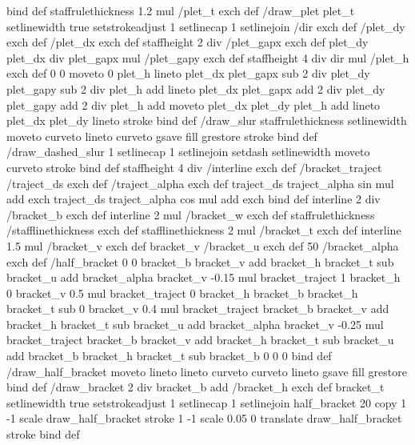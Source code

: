 {{{ } bind def
staffrulethickness 1.2 mul /plet_t exch def
/draw_plet
{
	plet_t setlinewidth
	true setstrokeadjust
	1 setlinecap
	1 setlinejoin
	/dir exch def
	/plet_dy exch def
	/plet_dx exch def
	staffheight 2 div /plet_gapx exch def
	plet_dy plet_dx div plet_gapx mul /plet_gapy exch def
	staffheight 4 div dir mul /plet_h exch def
%
	0 0 moveto
	0 plet_h lineto 
	plet_dx plet_gapx sub 2 div 
		plet_dy plet_gapy sub 2 div plet_h add lineto
	plet_dx plet_gapx add 2 div 
		plet_dy plet_gapy add 2 div plet_h add moveto
	plet_dx plet_dy plet_h add lineto
	plet_dx plet_dy lineto
	stroke
} bind def
%
/draw_slur
{
	staffrulethickness setlinewidth
	moveto
	curveto
	lineto
	curveto
	gsave
	fill
	grestore
	stroke
} bind def
%
/draw_dashed_slur
{
	1 setlinecap
	1 setlinejoin
	setdash
	setlinewidth
	moveto
	curveto
	stroke
} bind def
%
staffheight 4 div /interline exch def
%
/bracket_traject
{
  /traject_ds exch def
  /traject_alpha exch def
  traject_ds traject_alpha sin mul add
  exch
  traject_ds traject_alpha cos mul add
  exch
} bind def
%
interline 2 div /bracket_b exch def
interline 2 mul /bracket_w exch def
staffrulethickness /stafflinethickness exch def
stafflinethickness 2 mul /bracket_t exch def
interline 1.5 mul /bracket_v exch def
bracket_v /bracket_u exch def
50 /bracket_alpha exch def
%
/half_bracket
{
	0 0
	bracket_b bracket_v add bracket_h bracket_t sub bracket_u add
	bracket_alpha bracket_v -0.15 mul bracket_traject
	1 bracket_h
	0 bracket_v 0.5 mul bracket_traject
	0 bracket_h
	bracket_b bracket_h bracket_t sub
	0 bracket_v 0.4 mul bracket_traject
	bracket_b bracket_v add bracket_h bracket_t sub bracket_u add
	bracket_alpha bracket_v -0.25 mul bracket_traject
	bracket_b bracket_v add bracket_h bracket_t sub bracket_u add
	bracket_b bracket_h bracket_t sub
	bracket_b 0
	0 0
} bind def
%
/draw_half_bracket {
	moveto
	lineto
	lineto
	curveto
	curveto
	lineto
	gsave
	fill
	grestore
} bind def
%
/draw_bracket
{
	2 div bracket_b add /bracket_h exch def
	bracket_t setlinewidth
	true setstrokeadjust
	1 setlinecap
	1 setlinejoin
	half_bracket
	20 copy
	1 -1 scale
	draw_half_bracket
	stroke
	1 -1 scale
	0.05 0 translate
	draw_half_bracket
	stroke
} bind def
}}

\def\turnOnExperimentalFeatures{%
\special{ps:
}}

